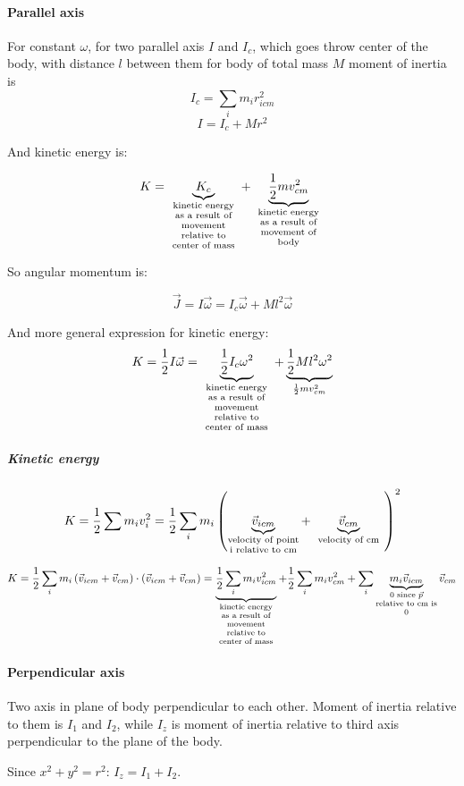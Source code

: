 \paragraph{Parallel axis}
For constant $\omega$, for two parallel axis $I$ and $I_c$, which goes throw center of the body, with distance $l$ between them for body of total mass $M$ moment of inertia is
$$I_c = \sum_i m_i r_{icm}^2$$
$$I = I_c + Mr^2$$

And kinetic energy is:

$$K = \underbrace{K_c}_{\parbox{2cm}{\scriptsize \centering kinetic energy as a result of movement relative to center of mass}} + \underbrace{\frac{1}{2}mv_{cm}^2}_{\parbox{2cm}{\scriptsize \centering kinetic energy as a result of movement of body}}$$

So angular momentum is:

$$\vec{J} = I\vec{\omega} = I_c\vec{\omega}+ Ml^2\vec{\omega}$$

And more general expression for kinetic energy:
$$K = \frac{1}{2}I\vec{\omega} = \underbrace{\frac{1}{2}I_c \omega^2}_{\parbox{2cm}{\scriptsize \centering kinetic energy as a result of movement relative to center of mass}} + \underbrace{\frac{1}{2}Ml^2\omega^2}_{\frac{1}{2}mv_{cm}^2}$$

\subparagraph{Kinetic energy}

$$K = \frac{1}{2} \sum m_i v_i^2 = \frac{1}{2} \sum_i m_i \left( \underbrace{\vec{v}_{icm}}_{\parbox{2cm}{\scriptsize \centering velocity of point i relative to cm}} + \underbrace{\vec{v}_{cm}}_{\parbox{2cm}{\scriptsize \centering velocity of cm}} \right)^2$$

$$K = \frac{1}{2} \sum_i m_i \left( \vec{v}_{icm} + \vec{v}_{cm}\right)\cdot \left( \vec{v}_{icm} + \vec{v}_{cm}\right) = \underbrace{\frac{1}{2}\sum_i m_i v_{icm}^2}_{\parbox{2cm}{\scriptsize \centering kinetic energy as a result of movement relative to center of mass}} + \frac{1}{2}\sum_i m_i v_{cm}^2 + \sum_i \underbrace{m_i \vec{v}_{icm}}_{\parbox{2cm}{\scriptsize \centering 0 since $\vec{p}$ relative to cm is 0}}\vec{v}_{cm} $$

\paragraph{Perpendicular axis}
Two axis in plane of body perpendicular to each other. Moment of inertia relative to them is $I_1$ and $I_2$, while $I_z$ is moment of inertia relative to third axis perpendicular to the plane of the body.

Since $x^2+y^2 = r^2$:
$I_z  = I_1+I_2$.
